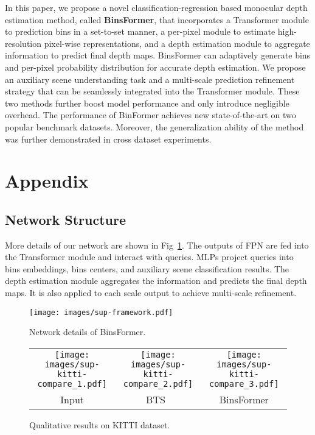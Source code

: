 \documentclass[runningheads]{llncs}
\begin{document}
In this paper, we propose a novel classification-regression based monocular depth estimation method, called \textbf{BinsFormer}, that incorporates a Transformer module to prediction bins in a set-to-set manner, a per-pixel module to estimate high-resolution pixel-wise representations, and a depth estimation module to aggregate information to predict final depth maps. BinsFormer can adaptively generate bins and per-pixel probability distribution for accurate depth estimation. We propose an auxiliary scene understanding task and a multi-scale prediction refinement strategy that can be seamlessly integrated into the Transformer module. These two methods further boost model performance and only introduce negligible overhead. The performance of BinFormer achieves new state-of-the-art on two popular benchmark datasets. Moreover, the generalization ability of the method was further demonstrated in cross dataset experiments.
 







\clearpage
\appendix
\section{Appendix}

\subsection{Network Structure}
More details of our network are shown in Fig~\ref{fig::framework-sup}. The outputs of FPN are fed into the Transformer module and interact with queries. MLPs project queries into bins embeddings, bins centers, and auxiliary scene classification results. The depth estimation module aggregates the information and predicts the final depth maps. It is also applied to each scale output to achieve multi-scale refinement.


\begin{figure}[t]
    \texttt{[image: images/sup-framework.pdf]}
    \caption{Network details of BinsFormer.}
    \label{fig::framework-sup}
\end{figure}

\begin{figure}[t]
    \begin{tabular}{ccc}
        \texttt{[image: images/sup-kitti-compare\_1.pdf]}&
        \texttt{[image: images/sup-kitti-compare\_2.pdf]}&
        \texttt{[image: images/sup-kitti-compare\_3.pdf]}\\
        Input & BTS~\cite{lee2019bts} & BinsFormer
    \end{tabular}
    \caption{Qualitative results on KITTI dataset.}
    \label{fig::kitti}
\end{figure}
\end{document}
